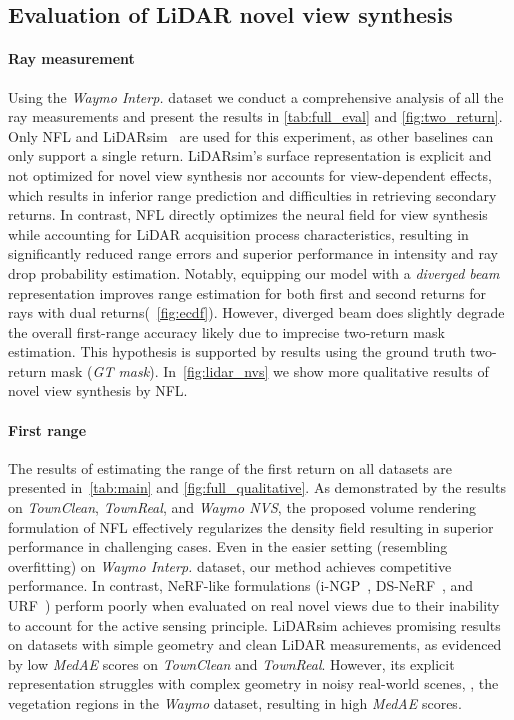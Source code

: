 \subsection{Evaluation of LiDAR novel view synthesis}
\label{sec:lidar_nvs_eval}

\paragraph{Ray measurement}
Using the \emph{Waymo Interp.} dataset we conduct a comprehensive analysis of all the ray measurements and present the results in \cref{tab:full_eval} and \cref{fig:two_return}. Only NFL and LiDARsim~\cite{manivasagam2020lidarsim} are used for this experiment, as other baselines can only support a single return. 
LiDARsim's surface representation is explicit and not optimized for novel view synthesis nor accounts for view-dependent effects, which results in inferior range prediction and difficulties in retrieving secondary returns. In contrast, NFL directly optimizes the neural field for view synthesis while accounting for LiDAR acquisition process characteristics, resulting in significantly reduced range errors and superior performance in intensity and ray drop probability estimation. Notably, equipping our model with a \textit{diverged beam} representation improves range estimation for both first and second returns for rays with dual returns(\cf ~\cref{fig:ecdf}). However, diverged beam does slightly degrade the overall first-range accuracy likely due to imprecise two-return mask estimation. This hypothesis is supported by results using the ground truth two-return mask (\textit{GT mask}). In~\cref{fig:lidar_nvs} we show more qualitative results of novel view synthesis by NFL.


\paragraph{First range}
The results of estimating the range of the first return on all datasets are presented in~\cref{tab:main} and \cref{fig:full_qualitative}. As demonstrated by the results on \textit{TownClean}, \textit{TownReal}, and \textit{Waymo NVS}, the proposed volume rendering formulation of NFL effectively regularizes the density field resulting in superior performance in challenging cases. Even in the easier setting (resembling overfitting) on \textit{Waymo Interp.} dataset, our method achieves competitive performance. In contrast, NeRF-like formulations (i-NGP~\cite{mueller2022instant}, DS-NeRF~\cite{deng2021depth}, and URF~\cite{rematas2021urban}) perform poorly when evaluated on real novel views due to their inability to account for the active sensing principle. LiDARsim achieves promising results on datasets with simple geometry and clean LiDAR measurements, as evidenced by low \textit{MedAE} scores on \textit{TownClean} and \textit{TownReal}. However, its explicit representation struggles with complex geometry in noisy real-world scenes, \eg, the vegetation regions in the \textit{Waymo} dataset, resulting in high \textit{MedAE} scores.


